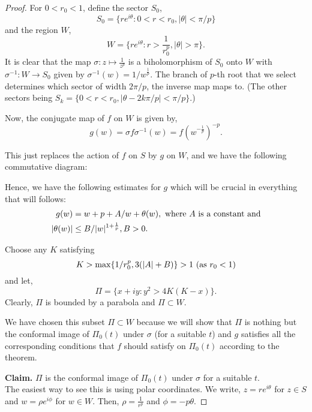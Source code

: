 \begin{proof}
	For \( 0<r_0<1 \), define the sector \( S_0 \), \[
		S_0=\{re^{i\theta}:0<r<r_0,|\theta |<\pi /p \}
	\] and the region \( W \), \[
	W=\{re^{i\theta }:r>\frac{1}{r_0^p},|\theta |>\pi\}
	.\] 
	It is clear that the map \( \sigma:z\mapsto \frac{1}{z^p} \) is a biholomorphism
	of \( S_0 \) onto \( W \) with \( \sigma^{-1}:W\to S_0 \) given by \( \sigma^{-1}(w)=1 /w^{\frac{1}{p}} \).
	The branch of \( p \)-th root that we select determines which sector of width \( 2\pi /p \), the inverse map
	maps to. (The other sectors being \( S_k=\{0<r<r_0,|\theta -2k\pi /p|<\pi /p \} \).)

	Now, the conjugate map of \( f \) on \( W \) is given by,\[
		g(w)=\sigma f \sigma ^{-1}(w)=f(w^{-\frac{1}{p}})^{-p}
	.\]

	This just replaces the action of \( f \) on \( S \) by \( g \) on \( W \),
	and we have the following commutative diagram:


	\noindent Hence, we have the following estimates 
	for \( g \) which will be crucial in everything that will follows:
	\begin{align}
		g(w)&=w+p+A /w+\theta (w),\text{ where \( A \) is a constant and} \label{eqn3.1}\\
		|\theta (w)|&\le B /|w|^{1+\frac{1}{p}}, B>0 \label{eqn3.2}
	.\end{align}

	\noindent Choose any \( K \) satisfying \[
	K>\max\{ 1 /r_0^p,3(|A|+B) \}>1 \text{ (as \( r_0<1 \))}
	\]  and let, \[
		\Pi=\{x+iy:y^2>4K(K-x)\}
	.\] Clearly, \( \Pi \) is bounded by a parabola and \( \Pi\subset W \).

	We have chosen this subset \( \Pi\subset W \) because we will show that \( \Pi \)
	is nothing but the conformal image of \( \Pi_0(t) \) under \( \sigma \) (for a suitable \( t \)) and
	\( g \) satisfies all the corresponding conditions that \( f \) should satisfy on \( \Pi_0(t) \) according to the
	theorem.\\
	\vspace{1pt}

	\noindent \textbf{Claim.} \( \Pi \) is the conformal image of \( \Pi_0(t) \) under \( \sigma \) for a suitable \( t \).\\
	The easiest way to see this is using polar coordinates. We write, \( z=re^{i\theta } \) for \( z\in S \) 
	and \( w=\rho e^{i \phi } \) for \( w\in W \). Then, \( \rho=\frac{1}{r^p} \) and \( \phi=-p\theta  \).
	

\end{proof}
